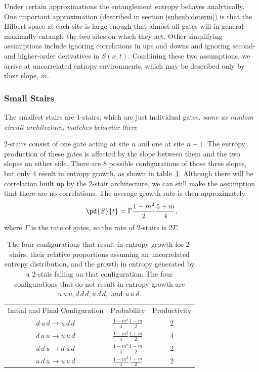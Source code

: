 Under certain approximations the entanglement entropy behaves analytically. One important approximation (described in section \ref{subsub:determ}) is that the Hilbert space at each site is large enough that almost all gates will in general maximally entangle the two sites on which they act. Other simplifying assumptions include ignoring correlations in ups and downs and ignoring second- and higher-order derivatives in $S(x,t)$. Combining these two assumptions, we arrive at uncorrelated entropy environments, which may be described only by their slope, $m$.

\subsubsection{Small Stairs} \label{subsub:smallstairs} 

The smallest stairs are 1-stairs, which are just individual gates. \emph{same as random circuit architecture, matches behavior there}

2-stairs consist of one gate acting at site $n$ and one at site $n+1$. The entropy production of these gates is affected by the slope between them and the two slopes on either side. There are 8 possible configurations of those three slopes, but only 4 result in entropy growth, as shown in table~\ref{tab:2stair}. Although there will be correlation built up by the 2-stair architecture, we can still make the assumption that there are no correlations. The average growth rate is then approximately
\begin{align}
\pd{S}{t} = \Gamma\frac{1-m^2}{2}\frac{5+m}{4}, \label{eqn:2rate}
\end{align}
where $\Gamma$ is the rate of gates, so the rate of 2-stairs is $2\Gamma$.

\begin{table}
	\centering
	\begin{tabular}{ccc}
		Initial and Final 
		Configuration        & Probability         & Productivity\\
		$d\,u\,d\to u\,d\,d$ & $\frac{1-m^2}{4}\frac{1-m}{2}$ & 2\\
		$d\,u\,u\to u\,u\,d$ & $\frac{1-m^2}{4}\frac{1+m}{2}$ & 4\\
		$d\,d\,u\to d\,u\,d$ & $\frac{1-m^2}{4}\frac{1-m}{2}$ & 2\\
		$u\,d\,u\to u\,u\,d$ & $\frac{1-m^2}{4}\frac{1+m}{2}$ & 2
	\end{tabular}
	\caption{The four configurations that result in entropy growth for 2-stairs, their relative proportions assuming an uncorrelated entropy distribution, and the growth in entropy generated by a 2-stair falling on that configuration. The four configurations that do not result in entropy growth are $u\,u\,u, d\,d\,d, u\,d\,d,$ and $u\,u\,d$.}
	\label{tab:2stair}
\end{table}

